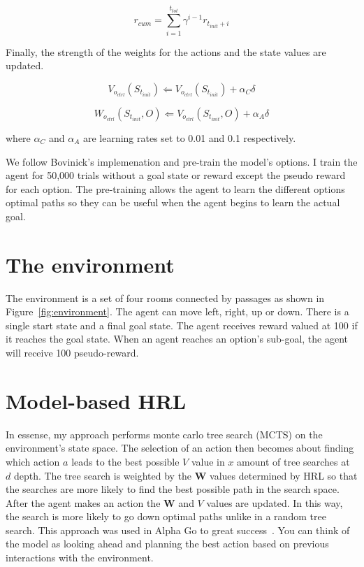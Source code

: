 \begin{equation}r_{cum} = \sum_{i=1}^{t_{tot}} \gamma^{i-1}r_{t_{init}+i}\end{equation}

Finally, the strength of the weights for the actions and the state values are updated.

\begin{equation}V_{o_{ctrl}}(S_{t_{init}}) \Longleftarrow V_{o_{ctrl}}(S_{t_{init}}) + \alpha_{C}\delta\end{equation}

\begin{equation}W_{o_{ctrl}}(S_{t_{init}},O) \Longleftarrow V_{o_{ctrl}}(S_{t_{init}},O) + \alpha_{A}\delta\end{equation}

where $\alpha_{C}$ and $\alpha_{A}$ are learning rates set to 0.01 and 0.1 respectively.

We follow Bovinick's implemenation and pre-train the model's options. I train the agent for 50,000 trials without a goal state or reward except the pseudo reward for each option. The pre-training allows the agent to learn the different options optimal paths so they can be useful when the agent begins to learn the actual goal.

\section{The environment}
The environment is a set of four rooms connected by passages as shown in Figure~\ref{fig:environment}. The agent can move left, right, up or down. There is a single start state and a final goal state. The agent receives reward valued at 100 if it reaches the goal state. When an agent reaches an option's sub-goal, the agent will receive 100 pseudo-reward.



\section{Model-based HRL}

In essense, my approach performs monte carlo tree search (MCTS) on the environment's state space. The selection of an action then becomes about finding which action $a$ leads to the best possible $V$ value in $x$ amount of tree searches at $d$ depth. The tree search is weighted by the \textbf{W} values determined by HRL so that the searches are more likely to find the best possible path in the search space. After the agent makes an action the \textbf{W} and $V$ values are updated. In this way, the search is more likely to go down optimal paths unlike in a random tree search. This approach was used in Alpha Go to great success~\cite{silver2016mastering}. You can think of the model as looking ahead and planning the best action based on previous interactions with the environment.

